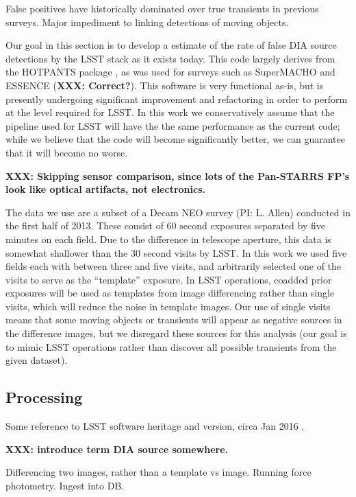 False positives have historically dominated over true transients in previous
surveys. \citep{denneau13, goldstein15, kessler15} Major impediment to linking
detections of moving objects.

Our goal in this section is to develop a estimate of the rate of
false DIA source detections by the LSST stack as it exists today. This code
largely derives from the HOTPANTS package \citep{becker15}, as was used for
surveys such as SuperMACHO and ESSENCE (\textbf{XXX: Correct?}). This software
is very functional as-is, but is presently undergoing significant improvement
and refactoring in order to perform at the level required for LSST. In this work
we conservatively assume that the pipeline used for LSST will have the the same
performance as the current code; while we believe that the code will become
significantly better, we can guarantee that it will become no worse.

\textbf{XXX: Skipping sensor comparison, since lots of the Pan-STARRS FP's look like
optical artifacts, not electronics.}

The data we use are a subset of a Decam NEO survey (PI: L. Allen) conducted in
the first half of 2013. These consist of 60 second exposures separated by five
minutes on each field. Due to the difference in telescope aperture, this data is
somewhat shallower than the 30 second visits by LSST. In this work we used five
fields each with between three and five visits, and arbitrarily selected one of
the visits to serve as the ``template'' exposure. In LSST operations, coadded
prior exposures will be used as templates from image differencing rather than
single visits, which will reduce the noise in template images. Our use of single
visits means that some moving objects or transients will appear as negative
sources in the difference images, but we disregard these sources for this
analysis (our goal is to mimic LSST operations rather than discover all possible
transients from the given dataset).

\subsection{Processing}

Some reference to LSST software heritage and version, circa Jan 2016
\citep{juric15}.

\textbf{XXX: introduce term DIA source somewhere.}

Differencing two images, rather than a template vs image. Running force
photometry. Ingest into DB.

